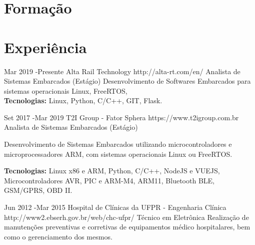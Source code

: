 \documentclass[10pt]{article} %
\begin{document}

\section{Formação}



\section{Experiência}

\job
{Mar 2019 -}{Presente}
{Alta Rail Technology}
{http://alta-rt.com/en/}
{Analista de Sistemas Embarcados (Estágio)}
{{Desenvolvimento de Softwares Embarcados para sistemas operacionais Linux, FreeRTOS,}\\\textbf{Tecnologias:} Linux, Python, C/C++, GIT, Flask.}


\job
{Set 2017 -}{Mar 2019}
{T2I Group - Fator Sphera}
{https://www.t2igroup.com.br}
{Analista de Sistemas Embarcados (Estágio)}
{{Desenvolvimento de Sistemas Embarcados utilizando microcontroladores e microprocessadores ARM, com sistemas operacionais Linux ou FreeRTOS.}\\
\rule{0mm}{5mm}\textbf{Tecnologias:} Linux x86 e ARM, Python, C/C++, NodeJS e VUEJS,  Microcontroladores AVR, PIC e ARM-M4, ARM11, Bluetooth BLE, GSM/GPRS, OBD II.}

\job
{Jun 2012 -}{Mar 2015}
{Hospital de Clínicas da UFPR - Engenharia Clínica}
{http://www2.ebserh.gov.br/web/chc-ufpr/}
{Técnico em Eletrônica}
{Realização de manutenções preventivas e corretivas de equipamentos médico hospitalares, bem como o gerenciamento dos mesmos.}
\end{document}
